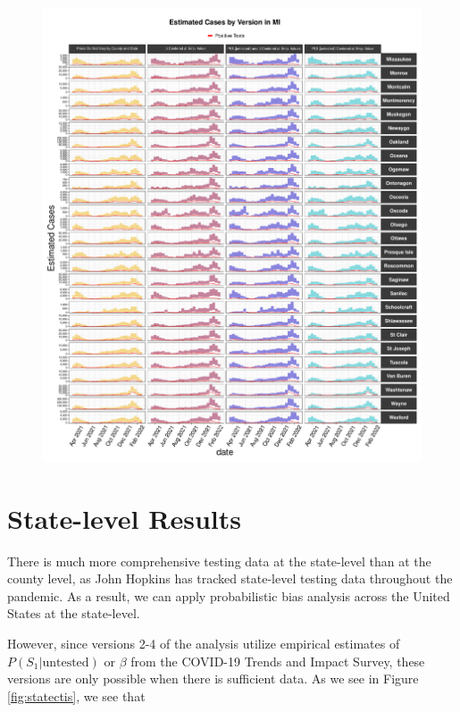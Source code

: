 \documentclass[12pt,twoside]{smiththesis}
\begin{document}
\begin{figure}
\includegraphics[width=1\linewidth]{figure/mi3_pb_compared_to_observed} \caption{\label{fig:pb_versions_mi}}\label{fig:unnamed-chunk-4-3}
\end{figure}
\hypertarget{state-level-results}{%
\section{State-level Results}\label{state-level-results}}

There is much more comprehensive testing data at the state-level than at the county level, as John Hopkins has tracked state-level testing data throughout the pandemic.
As a result, we can apply probabilistic bias analysis across the United States at the state-level.

However, since versions 2-4 of the analysis utilize empirical estimates of \(P(S_1|\text{untested})\) or \(\beta\) from the COVID-19 Trends and Impact Survey, these versions are only possible when there is sufficient data. As we see in Figure \ref{fig:statectis}, we see that
\end{document}
